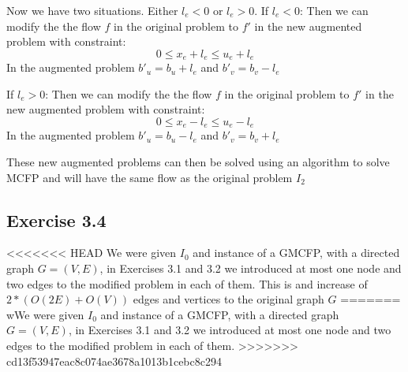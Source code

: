 Now we have two situations. Either \(l_e<0\) or \(l_e > 0\).\newline
If \(l_e<0\): Then we can modify the the flow \(f\) in the original problem to \(f'\) in the new augmented problem with constraint: \[ 0 \le x_e + l_e \le u_e + l_e\]
In the augmented problem \(b'_u = b_u + l_e\) and \(b'_v = b_v - l_e\)

If \(l_e>0\): Then we can modify the the flow \(f\) in the original problem to \(f'\) in the new augmented problem with constraint: \[ 0 \le x_e - l_e \le u_e - l_e\]
In the augmented problem \(b'_u = b_u - l_e\) and \(b'_v = b_v + l_e\)

These new augmented problems can then be solved using an algorithm to solve MCFP and will have the same flow as the original problem \(I_2\)


\subsection{Exercise 3.4}
<<<<<<< HEAD
We were given \(I_0\) and instance of a GMCFP, with a directed graph \(G =(V,E)\), in Exercises 3.1 and 3.2 we introduced at most one node and two edges to the modified problem in each of them. This is and increase of \(2*(O(2E)+O(V))\) edges and vertices to the original graph \(G\)
=======
wWe were given \(I_0\) and instance of a GMCFP, with a directed graph \(G =(V,E)\), in Exercises 3.1 and 3.2 we introduced at most one node and two edges to the modified problem in each of them.
>>>>>>> cd13f53947eac8c074ae3678a1013b1cebc8c294
